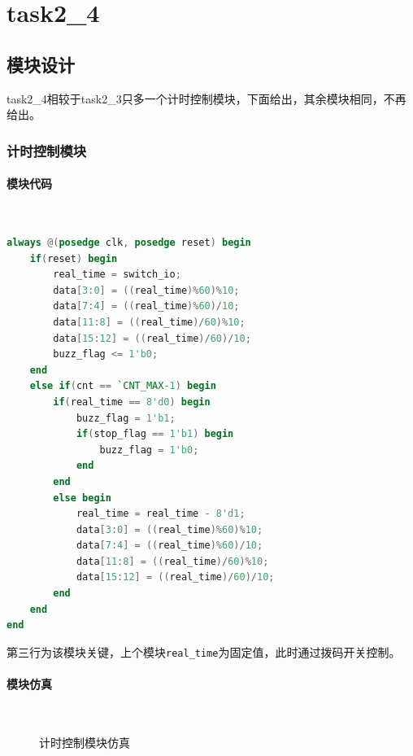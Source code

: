 \documentclass[UTF8]{ctexart}
\newcommand{\subsubsubsection}[1]{\paragraph{#1}\mbox{}\\}
\begin{document}
\section{task2\_4}
\subsection{模块设计}
task2\_4相较于task2\_3只多一个计时控制模块，下面给出，其余模块相同，不再给出。
\subsubsection{计时控制模块}
\subsubsubsection{模块代码}
\begin{framed}
    \begin{lstlisting}[language=verilog,style=verilogStyle]
always @(posedge clk, posedge reset) begin
    if(reset) begin
        real_time = switch_io;
        data[3:0] = ((real_time)%60)%10;
        data[7:4] = ((real_time)%60)/10;
        data[11:8] = ((real_time)/60)%10;
        data[15:12] = ((real_time)/60)/10;
        buzz_flag <= 1'b0; 
    end
    else if(cnt == `CNT_MAX-1) begin
        if(real_time == 8'd0) begin
            buzz_flag = 1'b1;
            if(stop_flag == 1'b1) begin
                buzz_flag = 1'b0;
            end
        end
        else begin
            real_time = real_time - 8'd1;
            data[3:0] = ((real_time)%60)%10;
            data[7:4] = ((real_time)%60)/10;
            data[11:8] = ((real_time)/60)%10;
            data[15:12] = ((real_time)/60)/10;
        end
    end
end
    \end{lstlisting}
\end{framed}
第三行为该模块关键，上个模块\texttt{real\_time}为固定值，此时通过拨码开关控制。
\subsubsubsection{模块仿真}
\begin{figure}[H]
    \centering
    \caption{计时控制模块仿真}
\end{figure}
\end{document}
